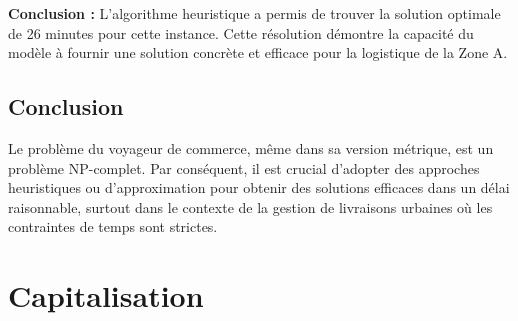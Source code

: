 \noindent \textbf{Conclusion :} L'algorithme heuristique a permis de trouver la solution optimale de 26 minutes pour cette instance. Cette résolution démontre la capacité du modèle à fournir une solution concrète et efficace pour la logistique de la Zone A.

\newpage

\subsection*{Conclusion}
{}

Le problème du voyageur de commerce, même dans sa version métrique, est un problème NP-complet. Par conséquent, il est crucial d'adopter des approches heuristiques ou d'approximation pour obtenir des solutions efficaces dans un délai raisonnable, surtout dans le contexte de la gestion de livraisons urbaines où les contraintes de temps sont strictes.

\noindent                                                                                                                                                                                                                                                                                                                                                                                                                                                                                                                                                                                                                                                                                                                                                                                                                                                                                                                                          	
\newpage

\section*{Capitalisation}

